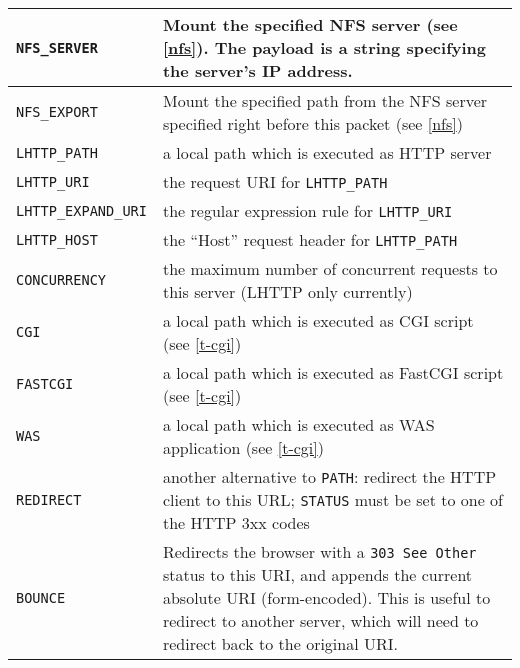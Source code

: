 \documentclass[a4paper,12pt]{article}
\begin{document}
\begin{longtable}{|l|p{8cm}|}
\hline

\verb|NFS_SERVER| & Mount the specified NFS server (see \ref{nfs}).
The payload is a string specifying the server's IP address. \\

\hline

\verb|NFS_EXPORT| & Mount the specified path from the NFS server
specified right before this packet (see \ref{nfs}) \\

\hline

\verb|LHTTP_PATH| & a local path which is executed as HTTP server \\

\hline

\verb|LHTTP_URI| & the request URI for \verb|LHTTP_PATH| \\

\hline

\verb|LHTTP_EXPAND_URI| & the regular expression rule for \verb|LHTTP_URI| \\

\hline

\verb|LHTTP_HOST| & the ``Host'' request header for \verb|LHTTP_PATH|
\\

\hline

\verb|CONCURRENCY| & the maximum number of concurrent requests to this
server (LHTTP only currently) \\

\hline

\verb|CGI| & a local path which is executed as CGI script (see
\ref{t-cgi}) \\

\hline

\verb|FASTCGI| & a local path which is executed as FastCGI script (see
\ref{t-cgi}) \\

\hline

\verb|WAS| & a local path which is executed as WAS application (see
\ref{t-cgi}) \\

\hline

\verb|REDIRECT| & another alternative to \verb|PATH|: redirect the
HTTP client to this URL; \verb|STATUS| must be set to one of the
HTTP 3xx codes \\

\hline

\verb|BOUNCE| & Redirects the browser with a \texttt{303 See Other}
status to this URI, and appends the current absolute URI
(form-encoded).  This is useful to redirect to another server, which
will need to redirect back to the original URI. \\


\end{longtable}
\end{document}
